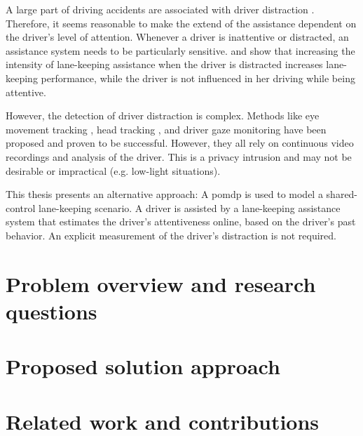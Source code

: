 A large part of driving accidents are associated with driver distraction \parencite{distracted_nhtsa}. Therefore, it seems reasonable to make the extend of the assistance dependent on the driver's level of attention. Whenever a driver is inattentive or distracted, an assistance system needs to be particularly sensitive. \cite{disracted-lane-keeping-1} and \cite{disracted-lane-keeping-2} show that increasing the intensity of lane-keeping assistance when the driver is distracted increases lane-keeping performance, while the driver is not influenced in her driving while being attentive. 

However, the detection of driver distraction is complex. Methods like eye movement tracking \parencite{eye-movement}, head tracking \parencite{head-tracking}, and driver gaze monitoring \parencite{gaze-monitoring} have been proposed and proven to be successful. However, they all rely on continuous video recordings and analysis of the driver. This is a privacy intrusion and may not be desirable or impractical (e.g. low-light situations). 

This thesis presents an alternative approach: A \Gls{pomdp} is used to model a shared-control lane-keeping scenario. A driver is assisted by a lane-keeping assistance system that estimates the driver's attentiveness online, based on the driver's past behavior. An explicit measurement of the driver's distraction is not required.

\section{Problem overview and research questions}



\section{Proposed solution approach}

\section{Related work and contributions}







